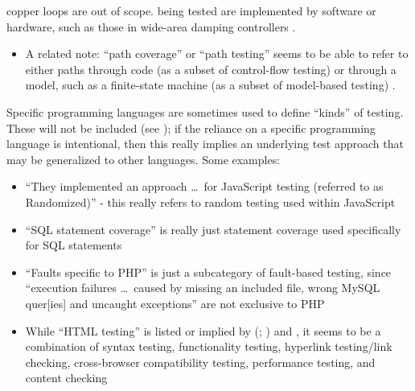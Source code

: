 \begin{enumerate}
{                  copper loops \citep{Goralski1999} are out of scope.} being
            tested are implemented by software or hardware, such as those in
            wide-area damping controllers \citep{PierreEtAl2017, TrudnowskiEtAl2017}.
            \begin{itemize}
                  \item A related note: ``path coverage'' or ``path testing''
                        seems to be able to refer to either paths through code
                        (as a subset of control-flow testing)
                        \citep[p.~5-13]{SWEBOK2024} or through a model, such as
                        a finite-state machine (as a subset of model-based
                        testing) \citep[p.~184]{DoğanEtAl2014}.
            \end{itemize}
\end{enumerate}

Specific programming languages are sometimes used to define ``kinds'' of
testing. These will not be included (see ); if the reliance
on a specific programming language is intentional, then this really implies an
underlying test approach that may be generalized to other languages. Some
examples:

\begin{itemize}
      \item ``They implemented an approach \dots\ for JavaScript testing
            (referred to as Randomized)'' \citep[p.~192]{DoğanEtAl2014} -
            this really refers to random testing used within JavaScript
      \item ``SQL statement coverage'' is really just statement coverage
            used specifically for SQL statements \citep[Tab.~13]{DoğanEtAl2014}
      \item ``Faults specific to PHP'' is just a subcategory of fault-based
            testing, since ``execution failures \dots\ caused by missing an
            included file, wrong MySQL quer[ies] and uncaught exceptions''
            are not exclusive to PHP \citep[Tab.~27]{DoğanEtAl2014}
      \item While ``HTML testing'' is listed or implied by
            \citeauthor{Gerrard2000a} (\citeyear[Tab.~2]{Gerrard2000a};
            \citeyear[Tab.~1, p.~3]{Gerrard2000b}) and
            \citet[p.~220]{Patton2006}, it seems to be a combination of syntax
            testing, functionality testing, hyperlink testing/link checking,
            cross-browser compatibility testing, performance testing, and
            content checking \citep[p.~3]{Gerrard2000b}
\end{itemize}

